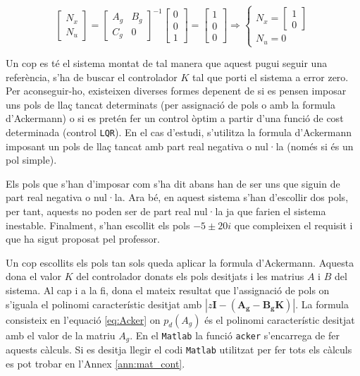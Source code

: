 \documentclass[12pt,a4paper,final,twoside,openright]{report}
\begin{document}
\begin{equation}\label{eq:Nx_Nu}
\begin{bmatrix}
N_x\\
N_u
\end{bmatrix}
=
\begin{bmatrix}
A_g & B_g\\
C_g & 0
\end{bmatrix}^{-1}
\begin{bmatrix}
0\\
0\\
1
\end{bmatrix}
=
\begin{bmatrix}
1\\
0\\
0
\end{bmatrix}
\Rightarrow \left\{
\begin{array}{lr}
N_x = \begin{bmatrix}
1\\
0
\end{bmatrix} \\
N_u = 0
\end{array}
\right.
\end{equation}

Un cop es té el sistema montat de tal manera que aquest pugui seguir una referència, s'ha de buscar el controlador $K$ tal que porti el sistema a error zero. Per aconseguir-ho, existeixen diverses formes depenent de si es pensen imposar uns pols de llaç tancat determinats (per assignació de pols o amb la formula d'Ackermann) o si es pretén fer un control òptim a partir d'una funció de cost determinada (control \texttt{LQR}). En el cas d'estudi, s'utilitza la formula d'Ackermann imposant un pols de llaç tancat amb part real negativa o nul·la (només si és un pol simple).

Els pols que s'han d'imposar com s'ha dit abans han de ser uns que siguin de part real negativa o nul·la. Ara bé, en aquest sistema s'han d'escollir dos pols, per tant, aquests no poden ser de part real nul·la ja que farien el sistema inestable. Finalment, s'han escollit els pols $-5\pm20i$ que compleixen el requisit i que ha sigut proposat pel professor. 

Un cop escollits els pols tan sols queda aplicar la formula d'Ackermann. Aquesta dona el valor $K$ del controlador donats els pols desitjats i les matrius $A$ i $B$ del sistema. Al cap i a la fi, dona el mateix resultat que l'assignació de pols on s'iguala el polinomi característic desitjat amb $|z \mathbf{I} - (\mathbf{A_g} - \mathbf{B_g K})|$. La formula consisteix en l'equació \eqref{eq:Acker} on $p_d(A_g)$ és el polinomi característic desitjat amb el valor de la matriu $A_g$. En el \texttt{Matlab} la funció \texttt{acker} s'encarrega de fer aquests càlculs. Si es desitja llegir el codi \texttt{Matlab} utilitzat per fer tots els càlculs es pot trobar en l'Annex \ref{ann:mat_cont}.
\end{document}
